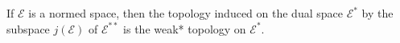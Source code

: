 If $\mathcal{E}$ is a normed space, then the topology induced on the dual space $\mathcal{E}^*$ by the subspace $j(\mathcal{E})$ of $\mathcal{E}^{**}$ is the weak* topology on $\mathcal{E}^*$.
